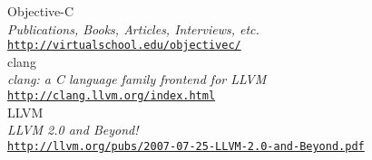 \cleardoublepage
{}
{}
\begin{thebibliography}{}

 Objective-C\\
  \emph{Publications, Books, Articles, Interviews, etc.} \\
  \footnotesize \texttt{\url{http://virtualschool.edu/objectivec/}} \\
  
 clang\\
  \emph{clang: a C language family frontend for LLVM} \\
  \footnotesize \texttt{\url{http://clang.llvm.org/index.html}} \\
  
 LLVM\\
 \emph{LLVM 2.0 and Beyond!} \\
  \footnotesize \texttt{\url{http://llvm.org/pubs/2007-07-25-LLVM-2.0-and-Beyond.pdf}} \\
  
\end{thebibliography}
